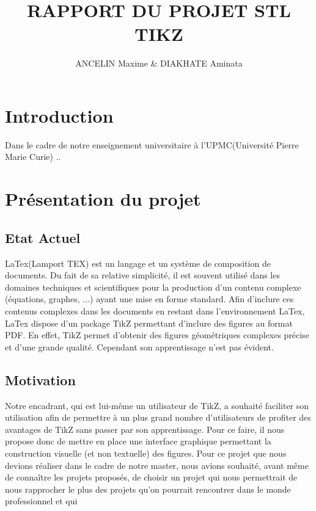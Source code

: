 \documentclass[a4paper]{report}
\title{RAPPORT DU PROJET STL \\ TIKZ}
\author{ANCELIN Maxime & DIAKHATE Aminata}
\begin{document}
\titleformat{\chapter}[hang]{\bf\huge}{\thechapter}{2pc}{} 

\tableofcontents
\newpage


 \newpage
 \chapter{Introduction}
  Dans le cadre de notre enseignement universitaire à l'UPMC(Université Pierre Marie Curie) ..
  
  \chapter{Présentation du projet}
  \section{Etat Actuel}
  LaTex(Lamport TEX) est un langage et un système de composition de documents. Du fait de sa relative simplicité, il est souvent utilisé dans les domaines techniques et scientifiques pour la production d'un contenu complexe (équations, graphes, ...) ayant une mise en forme standard. Afin d'inclure ces contenus complexes dans les documents en restant dans l'environnement LaTex, LaTex dispose d'un package TikZ permettant d'inclure des figures au format PDF. En effet, TikZ permet d'obtenir des figures géométriques complexes précise et d'une grande qualité. Cependant son apprentissage n'est pas évident. 
  \section{Motivation}
  Notre encadrant, qui est lui-même un utilisateur de TikZ, a souhaité faciliter son utilisation afin de permettre à un plus grand nombre d'utilisateurs de profiter des avantages de TikZ sans passer par son apprentissage. Pour ce faire, il nous propose donc de mettre en place une interface graphique permettant la construction  visuelle (et non textuelle) des figures.
  \newline
  Pour ce projet que nous devions réaliser dans le cadre de notre master, nous avions souhaité, avant même de 
connaître les projets proposés, de choisir un projet qui nous permettrait de nous rapprocher le plus des projets qu'on pourrait rencontrer dans le monde professionnel et qui 
\end{document}

